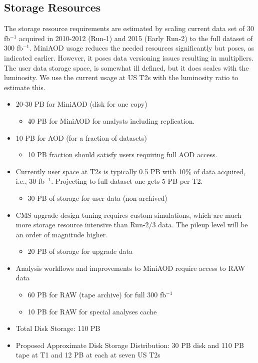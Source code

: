 \subsection{Storage Resources}

The storage resource requirements are estimated by scaling current data set 
of 30 fb$^{-1}$ acquired in 2010-2012 (Run-1) and 2015 (Early Run-2) to the
full dataset of 300 fb$^{-1}$.  MiniAOD usage reduces the needed resources
significantly but poses, as indicated earlier.  However, it poses data versioning
issues resulting in multipliers.  The user data storage space, is somewhat
ill defined, but it does scales with the luminosity. We use the current usage
at US T2s with the luminosity ratio to estimate this.  

\begin{itemize}
\item 20-30 PB for MiniAOD (disk for one copy)
\begin{itemize}
\item 40 PB for MiniAOD for analysts including replication.
\end{itemize}
\item 10 PB for AOD (for a fraction of datasets)
\begin{itemize}
\item 10 PB fraction should satisfy users requiring full AOD access.
\end{itemize}
\item Currently user space at T2s is typically 0.5 PB with 10\% of data acquired, i.e., 30 fb$^{-1}$.
Projecting to full dataset one gets 5 PB per T2.
\begin{itemize} 
\item 30 PB of storage for user data (non-archived)
\end{itemize}
\item CMS upgrade design tuning requires custom simulations, which are much more
storage resource intensive than Run-2/3 data.  The pileup level will be an order of
magnitude higher.
\begin{itemize} 
\item 20 PB of storage for upgrade data
\end{itemize} 
\item Analysis workflows and improvements to MiniAOD require access to RAW data
\begin{itemize}
\item 60 PB for RAW (tape archive) for full 300 fb$^{-1}$
\end{itemize} 
\begin{itemize}
\item 10 PB for RAW for special analyses cache
\end{itemize}
\item Total Disk Storage:  110 PB
\item Proposed Approximate Disk Storage Distribution: 30 PB disk and 110 PB tape at T1 and 12 PB at each at seven US T2s
\end{itemize}

